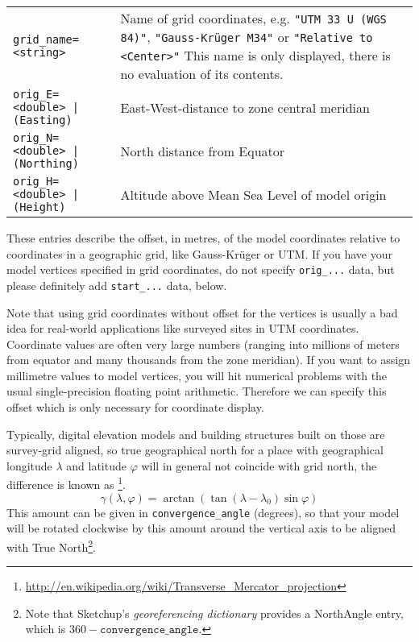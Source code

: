 \begin{longtable}{lp{84mm}} 
\texttt{grid\_name=<string> }& Name of grid coordinates, e.g. \texttt{"UTM 33 U (WGS 84)"},
                               \texttt{"Gauss-Kr\"uger M34"} or \texttt{"Relative to <Center>"} This name is
                              only displayed, there is no evaluation of its contents.\\
\texttt{orig\_E=<double> | (Easting)}  &East-West-distance to zone central meridian\\
\texttt{orig\_N=<double> | (Northing)} &North distance from Equator\\
\texttt{orig\_H=<double> | (Height)}   &Altitude above Mean Sea Level of model origin\\
\end{longtable}

\noindent These entries describe the offset, in metres, of the model coordinates relative
to coordinates in a geographic grid, like Gauss-Kr\"uger or UTM. If you have your model
vertices specified in grid coordinates, do not specify \verb|orig_...| data, but
please definitely add \verb|start_...| data, below.

Note that using grid coordinates without offset for the vertices is
usually a bad idea for real-world applications like surveyed sites in
UTM coordinates. Coordinate values are often very large numbers
(ranging into millions of meters from equator and many thousands from
the zone meridian). If you want to assign millimetre values to model
vertices, you will hit numerical problems with the usual
single-precision floating point arithmetic. Therefore we can specify
this offset which is only necessary for coordinate display.

Typically, digital elevation models and building structures built on
those are survey-grid aligned, so true geographical north for a place
with geographical longitude $\lambda$ and latitude $\varphi$ will in
general not coincide with grid north, the difference is known as
\footnote{%
  \url{http://en.wikipedia.org/wiki/Transverse_Mercator_projection}}.
\begin{equation}
\gamma(\lambda, \varphi)=\arctan(\tan(\lambda-\lambda_0)\sin\varphi)
\end{equation}
This amount can be given in \verb|convergence_angle| (degrees), so
that your model will be rotated clockwise by this amount around the
vertical axis to be aligned with True North\footnote{Note that
  Sketchup's \emph{georeferencing dictionary} provides a NorthAngle
  entry, which is $360-\mathtt{convergence\_angle}$.}.

